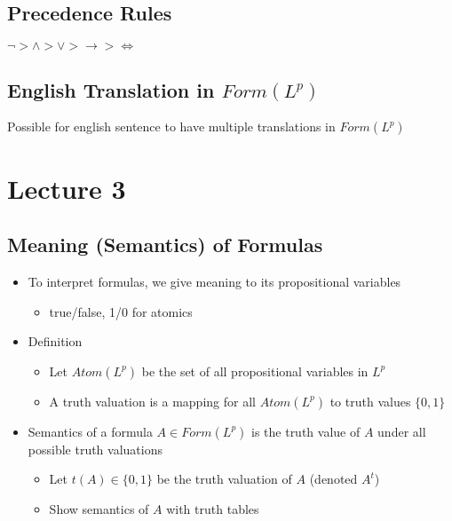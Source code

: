 \documentclass[11pt]{article}
\begin{document}
\subsection{Precedence Rules}
$\neg > \land > \lor > \rightarrow > \iff$
\subsection{English Translation in $Form(L^p)$}
Possible for english sentence to have multiple translations in $Form(L^p)$

\section{Lecture 3}
\subsection{Meaning (Semantics) of Formulas}
\begin{itemize}
    \item To interpret formulas, we give meaning to its propositional variables 
    \begin{itemize}
        \item true/false, 1/0 for atomics
    \end{itemize}
    \item Definition 
    \begin{itemize}
        \item Let $Atom(L^p)$ be the set of all propositional variables in $L^p$
        \item A truth valuation is a mapping for all $Atom(L^p)$ to truth values $\{0, 1\}$
    \end{itemize}
    \item Semantics of a formula $A\in Form(L^p)$ is the truth value of $A$ under all possible truth valuations
    \begin{itemize}
        \item Let $t(A)\in\{0, 1\}$ be the truth valuation of $A$ (denoted $A^t$)
        \item Show semantics of $A$ with truth tables 
    \end{itemize}
\end{itemize}
\end{document}
